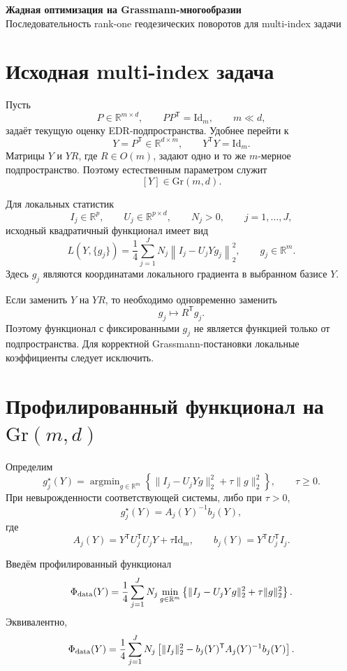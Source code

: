 \documentclass[11pt,a4paper]{article}
\newcommand{\R}{\mathbb R}
\newcommand{\T}{^{\mathsf T}}
\newcommand{\Id}{\mathrm{Id}}
\newcommand{\Gr}{\mathrm{Gr}}
\DeclareMathOperator{\argmin}{argmin}
\begin{document}
\begin{center}
{\Large\bfseries Жадная оптимизация на Grassmann-многообразии}\\[4pt]
{\large Последовательность rank-one геодезических поворотов для multi-index задачи}
\end{center}

\section{Исходная multi-index задача}

Пусть
\[
    P\in\R^{m\times d},
    \qquad
    PP\T=\Id_m,
    \qquad
    m\ll d,
\]
задаёт текущую оценку EDR-подпространства. Удобнее перейти к
\[
    Y=P\T\in\R^{d\times m},
    \qquad
    Y\T Y=\Id_m.
\]
Матрицы \(Y\) и \(YR\), где \(R\in O(m)\), задают одно и то же
\(m\)-мерное подпространство. Поэтому естественным параметром служит
\[
    [Y]\in \Gr(m,d).
\]

Для локальных статистик
\[
    I_j\in\R^p,
    \qquad
    U_j\in\R^{p\times d},
    \qquad
    N_j>0,
    \qquad
    j=1,\ldots,J,
\]
исходный квадратичный функционал имеет вид
\[
    L(Y,\{g_j\})
    =
    \frac14
    \sum_{j=1}^J
    N_j
    \left\|
        I_j-U_jYg_j
    \right\|_2^2,
    \qquad
    g_j\in\R^m.
\]
Здесь \(g_j\) являются координатами локального градиента в выбранном
базисе \(Y\).

Если заменить \(Y\) на \(YR\), то необходимо одновременно заменить
\[
    g_j\mapsto R\T g_j.
\]
Поэтому функционал с фиксированными \(g_j\) не является функцией только
от подпространства. Для корректной Grassmann-постановки локальные
коэффициенты следует исключить.

\section{Профилированный функционал на \(\Gr(m,d)\)}

Определим
\[
    g_j^\star(Y)
    =
    \argmin_{g\in\R^m}
    \left\{
        \|I_j-U_jYg\|_2^2+\tau\|g\|_2^2
    \right\},
    \qquad
    \tau\ge 0.
\]
При невырожденности соответствующей системы, либо при \(\tau>0\),
\[
    g_j^\star(Y)
    =
    A_j(Y)^{-1}b_j(Y),
\]
где
\[
    A_j(Y)
    =
    Y\T U_j\T U_jY+\tau\Id_m,
    \qquad
    b_j(Y)
    =
    Y\T U_j\T I_j.
\]

Введём профилированный функционал
\[
    \Phi_{\rm data}(Y)
    =
    \frac14
    \sum_{j=1}^J
    N_j
    \min_{g\in\R^m}
    \left\{
        \|I_j-U_jYg\|_2^2+\tau\|g\|_2^2
    \right\}.
\]
Эквивалентно,
\[
    \Phi_{\rm data}(Y)
    =
    \frac14
    \sum_{j=1}^J
    N_j
    \left[
        \|I_j\|_2^2
        -
        b_j(Y)\T A_j(Y)^{-1}b_j(Y)
    \right].
\]
\end{document}

